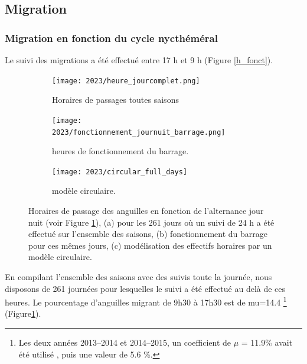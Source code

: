 \documentclass[11pt,twocolumn,titlepage,twoside]{article}
\begin{document}
\subsection{Migration}
\subsubsection{Migration en fonction du cycle nycthéméral}

Le suivi des migrations a été effectué entre 17 h et 9 h (Figure
\ref{h_fonct}). 


\begin{figure}[htbp]
        \centering        
        \begin{subfigure}{0.4\textwidth}
                \centering
                \texttt{[image: 2023/heure\_jourcomplet.png]}
                \caption{Horaires de passages toutes saisons}
           \label{fig_heure_jourcomplet}
        \end{subfigure}
        \begin{subfigure}{0.55\textwidth}
                \centering
                \texttt{[image: 2023/fonctionnement\_journuit\_barrage.png]} 
                \caption{heures de fonctionnement du barrage.}
        \label{fig_fonctionnement_journuit_barrage}
        \end{subfigure}
         \begin{subfigure}{0.4\textwidth}
                \centering
                \texttt{[image: 2023/circular\_full\_days]} 
                \caption{modèle circulaire.}
        \label{fig_circular_full_days}
        \end{subfigure}
        \caption[Horaires de  passage]{Horaires de passage des anguilles 
        en fonction de l'alternance jour nuit (voir Figure \ref{fig_heure_jourcomplet}), 
        (a) pour les 261 jours où un suivi de 24 h a été
                effectué sur l'ensemble des saisons, 
        (b) fonctionnement du barrage pour ces mêmes jours,
        (c) modélisation des effectifs horaires par un modèle circulaire.}
        \label{h_pass}
\end{figure}

En compilant l'ensemble des saisons avec des suivis toute la journée, nous
disposons de \num[round-mode = places,
 round-precision = 0]{261} journées pour lesquelles le
suivi a été effectué au delà de ces heures. Le pourcentage d'anguilles migrant
de 9h30 à 17h30 est de mu=14.4 \footnote{Les deux années
2013--2014 et 2014--2015, un coefficient de $\mu$ =  11.9\% avait été
utilisé \citep{briand_suivi_2015, briand_suivi_2016}, 
puis une valeur de 5.6 \%.} (Figure\ref{fig_heure_jourcomplet}).
\end{document}
